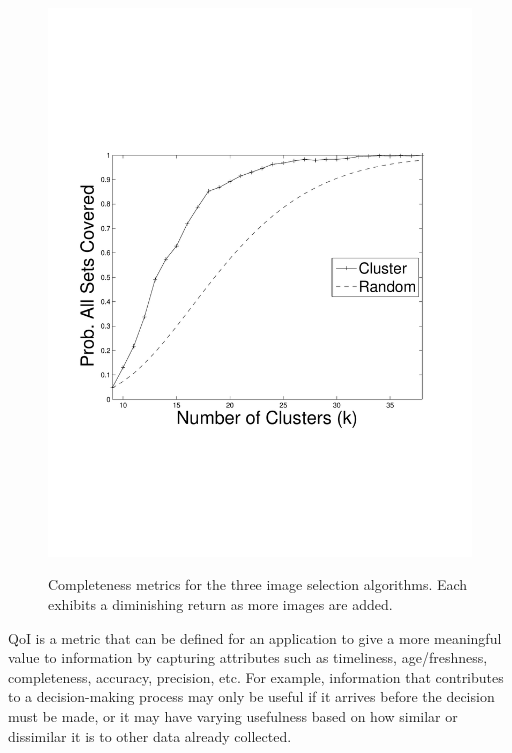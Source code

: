 \begin{figure}
{        \includegraphics[clip=true, trim = 15mm 65mm 20mm 70mm, scale=0.23]{figures/cluster/perc_all_sets_covered_vary_k.pdf}
        \label{fig:clusterAvgNumSetsCov}
        }
        
        \vspace{-1mm}
   \caption{Completeness metrics for the three image selection algorithms. Each exhibits a diminishing return as more images are added.}
   \label{fig:completeness_exp_results}
   \vspace{-6mm}
\end{figure}

QoI is a metric that can be defined for an application to give a more meaningful value to information by capturing attributes such as  timeliness, age/freshness, completeness, accuracy, precision, etc.  
For example, information that contributes to a decision-making process may only be useful if it arrives before the decision must be made, or it may have varying usefulness based on how similar or dissimilar it is to other data already collected.

